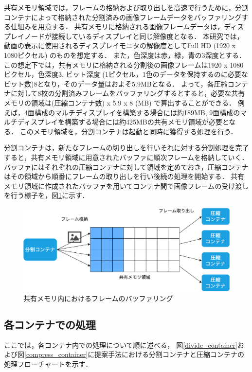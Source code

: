 共有メモリ領域では，フレームの格納および取り出しを高速で行うために，分割コンテナによって格納された分割済みの画像フレームデータをバッファリングする仕組みを用意する．
共有メモリに格納される画像フレームデータは，ディスプレイノードが接続しているディスプレイと同じ解像度となる．
本研究では，動画の表示に使用されるディスプレイモニタの解像度としてFull HD (1920 x 1080ピクセル) のものを想定する．
また，色深度は赤，緑，青の3深度とする．
この想定下では，共有メモリに格納される分割後の画像フレームは1920 x 1080ピクセル，色深度3, ビット深度 (1ピクセル，1色のデータを保持するのに必要なビット数)8となり，そのデータ量はおよそ5.9MBとなる．
よって，各圧縮コンテナに対して8枚の分割済みフレームをバッファリングするとすると，必要な共有メモリの領域は(圧縮コンテナ数) x 5.9 x 8 (MB) で算出することができる．
例えば，4面構成のマルチディスプレイを構築する場合には約189MB, 9面構成のマルチディスプレイを構築する場合には約425MBの共有メモリ領域が必要となる．
このメモリ領域を，分割コンテナは起動と同時に獲得する処理を行う．

分割コンテナは，新たなフレームの切り出しを行いそれに対する分割処理を完了すると，共有メモリ領域に用意されたバッファに順次フレームを格納していく．
バッファにはそれぞれの圧縮コンテナに対して領域を定めておき，圧縮コンテナはその領域から順番にフレームの取り出しを行い後続の処理を開始する．
共有メモリ領域に作成されたバッファを用いてコンテナ間で画像フレームの受け渡しを行う様子を，図\ref{buffer}に示す．

\begin{figure}[H]
    \hspace*{\fill}
    \includegraphics[width=\linewidth]{./fig/chap3/buffering.eps}
    \hspace*{\fill}
    \caption{共有メモリ内におけるフレームのバッファリング}
    \label{buffer}
\end{figure}

\subsection*{各コンテナでの処理}
ここでは，各コンテナ内での処理について順に述べる，
図\ref{divide_container}および図\ref{compress_container}に提案手法における分割コンテナと圧縮コンテナの処理フローチャートを示す．

